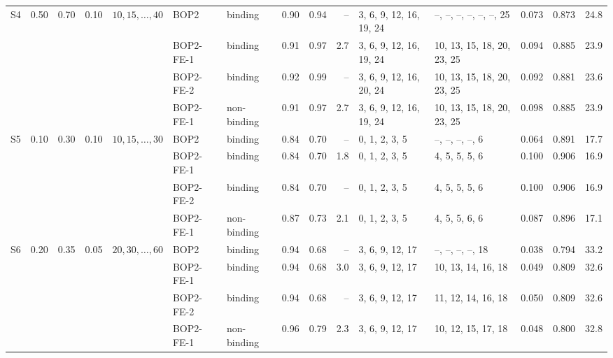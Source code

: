 \begin{table}
\begin{tabular}{lllllllrrrllrrr}
\midrule
S4 & 0.50 & 0.70 & 0.10 & $10, 15, \ldots, 40$ & BOP2 & binding & 0.90 & 0.94 & -- & 3, 6, 9, 12, 16, 19, 24 & --, --, --, --, --, --, 25 & 0.073 & 0.873 & 24.8 \\
 &  &  &  &  & BOP2-FE-1 & binding & 0.91 & 0.97 & 2.7 & 3, 6, 9, 12, 16, 19, 24 & 10, 13, 15, 18, 20, 23, 25 & 0.094 & 0.885 & 23.9 \\
 &  &  &  &  & BOP2-FE-2 & binding & 0.92 & 0.99 & -- & 3, 6, 9, 12, 16, 20, 24 & 10, 13, 15, 18, 20, 23, 25 & 0.092 & 0.881 & 23.6 \\
 &  &  &  &  & BOP2-FE-1 & non-binding & 0.91 & 0.97 & 2.7 & 3, 6, 9, 12, 16, 19, 24 & 10, 13, 15, 18, 20, 23, 25 & 0.098 & 0.885 & 23.9 \\
\midrule
S5 & 0.10 & 0.30 & 0.10 & $10, 15, \ldots, 30$ & BOP2 & binding & 0.84 & 0.70 & -- & 0, 1, 2, 3, 5 & --, --, --, --, 6 & 0.064 & 0.891 & 17.7 \\
 &  &  &  &  & BOP2-FE-1 & binding & 0.84 & 0.70 & 1.8 & 0, 1, 2, 3, 5 & 4, 5, 5, 5, 6 & 0.100 & 0.906 & 16.9 \\
 &  &  &  &  & BOP2-FE-2 & binding & 0.84 & 0.70 & -- & 0, 1, 2, 3, 5 & 4, 5, 5, 5, 6 & 0.100 & 0.906 & 16.9 \\
 &  &  &  &  & BOP2-FE-1 & non-binding & 0.87 & 0.73 & 2.1 & 0, 1, 2, 3, 5 & 4, 5, 5, 6, 6 & 0.087 & 0.896 & 17.1 \\
\midrule
S6 & 0.20 & 0.35 & 0.05 & $20, 30, \ldots, 60$ & BOP2 & binding & 0.94 & 0.68 & -- & 3, 6, 9, 12, 17 & --, --, --, --, 18 & 0.038 & 0.794 & 33.2 \\
 &  &  &  &  & BOP2-FE-1 & binding & 0.94 & 0.68 & 3.0 & 3, 6, 9, 12, 17 & 10, 13, 14, 16, 18 & 0.049 & 0.809 & 32.6 \\
 &  &  &  &  & BOP2-FE-2 & binding & 0.94 & 0.68 & -- & 3, 6, 9, 12, 17 & 11, 12, 14, 16, 18 & 0.050 & 0.809 & 32.6 \\
 &  &  &  &  & BOP2-FE-1 & non-binding & 0.96 & 0.79 & 2.3 & 3, 6, 9, 12, 17 & 10, 12, 15, 17, 18 & 0.048 & 0.800 & 32.8 \\
\bottomrule
\end{tabular}
\par\medskip
\begin{minipage}{0.95\textwidth}
\footnotesize

\end{minipage}
\end{table}
